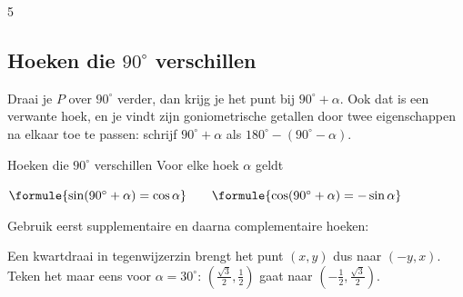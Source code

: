 
\begin{oefeningen}
\end{oefeningen}

\begin{alleenvoor}{5}
\subsection{Hoeken die $90^\circ$ verschillen}

Draai je $P$ over $90^\circ$ verder, dan krijg je het punt bij $90^\circ + \alpha$. Ook dat is een verwante hoek, en je vindt zijn goniometrische getallen door twee eigenschappen na elkaar toe te passen: schrijf $90^\circ + \alpha$ als $180^\circ - (90^\circ - \alpha)$.

\begin{theorie}
\begin{stelling}{Hoeken die $90^\circ$ verschillen}
Voor elke hoek $\alpha$ geldt

\vspace{1mm}
\qquad $\formule{\sin(90^\circ + \alpha) = \cos\alpha} \qquad \formule{\cos(90^\circ + \alpha) = -\sin\alpha}$
\end{stelling}

\begin{bewijs}
Gebruik eerst supplementaire en daarna complementaire hoeken:
\end{bewijs}
\end{theorie}

Een kwartdraai in tegenwijzerzin brengt het punt $(x, y)$ dus naar $(-y, x)$. Teken het maar eens voor $\alpha = 30^\circ$: $(\tfrac{\sqrt3}{2}, \tfrac12)$ gaat naar $(-\tfrac12, \tfrac{\sqrt3}{2})$.


\end{alleenvoor}
